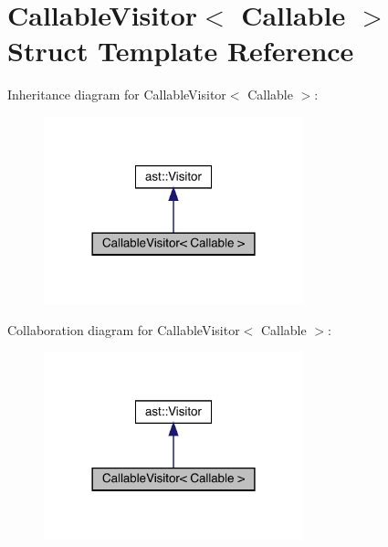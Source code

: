 \hypertarget{struct_callable_visitor}{}\section{Callable\+Visitor$<$ Callable $>$ Struct Template Reference}
\label{struct_callable_visitor}


Inheritance diagram for Callable\+Visitor$<$ Callable $>$\+:
\nopagebreak
\begin{figure}[H]
\begin{center}
\leavevmode
\includegraphics[width=213pt]{struct_callable_visitor__inherit__graph}
\end{center}
\end{figure}


Collaboration diagram for Callable\+Visitor$<$ Callable $>$\+:
\nopagebreak
\begin{figure}[H]
\begin{center}
\leavevmode
\includegraphics[width=213pt]{struct_callable_visitor__coll__graph}
\end{center}
\end{figure}
